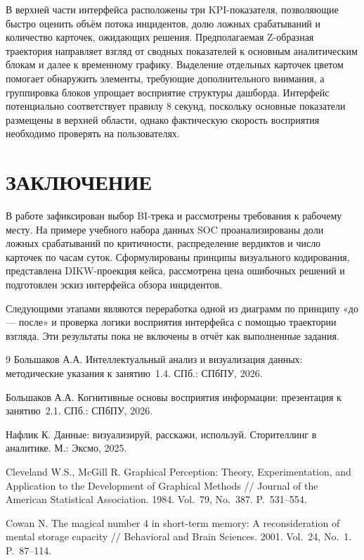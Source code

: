 \documentclass[12pt]{extreport}
\begin{document}
В верхней части интерфейса расположены три
KPI-показателя, позволяющие быстро оценить
объём потока инцидентов, долю ложных срабатываний
и количество карточек, ожидающих решения.
Предполагаемая Z-образная траектория направляет
взгляд от сводных показателей к основным
аналитическим блокам и далее к временному графику.
Выделение отдельных карточек цветом помогает
обнаружить элементы, требующие дополнительного
внимания, а группировка блоков упрощает
восприятие структуры дашборда.
Интерфейс потенциально соответствует правилу
8 секунд, поскольку основные показатели
размещены в верхней области, однако фактическую
скорость восприятия необходимо проверять
на пользователях.



    \newpage
	\section*{ЗАКЛЮЧЕНИЕ}
	
	В работе зафиксирован выбор BI-трека и рассмотрены требования к рабочему месту. На примере учебного набора данных SOC проанализированы доли ложных срабатываний по критичности, распределение вердиктов и число карточек по часам суток. Сформулированы принципы визуального кодирования, представлена DIKW-проекция кейса, рассмотрена цена ошибочных решений и подготовлен эскиз интерфейса обзора инцидентов.

	Следующими этапами являются переработка одной из диаграмм по принципу «до --- после» и проверка логики восприятия интерфейса с помощью траектории взгляда. Эти результаты пока не включены в отчёт как выполненные задания.

	\renewcommand{\bibname}{\vspace{-2cm}\large СПИСОК ИСПОЛЬЗОВАННЫХ ИСТОЧНИКОВ}
	
	\begin{thebibliography}{9}
		Большаков А.А. Интеллектуальный анализ и визуализация данных: методические указания к занятию~1.4. СПб.: СПбПУ, 2026.
		
		Большаков А.А. Когнитивные основы восприятия информации: презентация к занятию~2.1. СПб.: СПбПУ, 2026.
		
		Нафлик К. Данные: визуализируй, расскажи, используй. Сторителлинг в аналитике. М.: Эксмо, 2025.
		
		Cleveland W.S., McGill R. Graphical Perception: Theory, Experimentation, and Application to the Development of Graphical Methods // Journal of the American Statistical Association. 1984. Vol.~79, No.~387. P.~531--554.
		
		Cowan N. The magical number 4 in short-term memory: A reconsideration of mental storage capacity // Behavioral and Brain Sciences. 2001. Vol.~24, No.~1. P.~87--114.
	\end{thebibliography}
	
\end{document}
